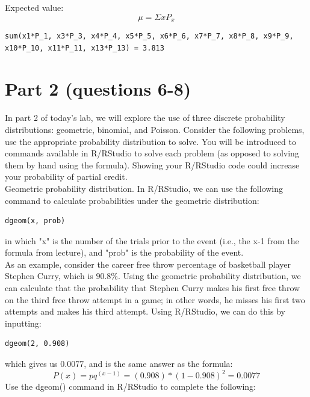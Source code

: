 \documentclass{article}
\begin{document}
Expected value:
\[
 \mu = \Sigma x P_x
\]

\begin{center}
\begin{lstlisting}
sum(x1*P_1, x3*P_3, x4*P_4, x5*P_5, x6*P_6, x7*P_7, x8*P_8, x9*P_9, x10*P_10, x11*P_11, x13*P_13) = 3.813
\end{lstlisting}
\end{center}
 
\section{Part 2 (questions 6-8)}


In part 2 of today’s lab, we will explore the use of three discrete probability distributions: geometric, binomial, and Poisson. Consider the following problems, use the appropriate probability distribution to solve. You will be introduced to commands available in R/RStudio to solve each problem (as opposed to solving them by hand using the formula). Showing your R/RStudio code could increase your probability of partial credit.\\

Geometric probability distribution. In R/RStudio, we can use the following command to calculate probabilities under the geometric distribution:
\begin{center}
\begin{lstlisting}
dgeom(x, prob)
\end{lstlisting}
\end{center}
in which "x" is the number of the trials prior to the event (i.e., the x-1 from the formula from lecture), and "prob" is the probability of the event.\\

As an example, consider the career free throw percentage of basketball player Stephen Curry, which is $90.8\%$. Using the geometric probability distribution, we can calculate that the probability that Stephen Curry makes his first free throw on the third free throw attempt in a game; in other words, he misses his first two attempts and makes his third attempt. Using R/RStudio, we can do this by inputting:
\begin{center}
\begin{lstlisting}
dgeom(2, 0.908)
\end{lstlisting}
\end {center}
which gives us 0.0077, and is the same answer as the formula:
\[
P(x) = pq^{\left(x-1\right)} = (0.908)*(1-0.908)^2 = 0.0077
\]
Use the dgeom() command in R/RStudio to complete the following:\\
\end{document}
